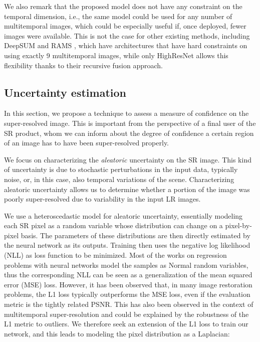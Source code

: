 \documentclass[journal]{IEEEtran}
\begin{document}
We also remark that the proposed model does not have any constraint on the temporal dimension, i.e., the same model could be used for any number of multitemporal images, which could be especially useful if, once deployed, fewer images were available. This is not the case for other existing methods, including DeepSUM \cite{molini2019deepsum} and RAMS \cite{salvetti2020multi}, which have architectures that have hard constraints on using exactly 9 multitemporal images, while only HighResNet \cite{rarefin2020multi} allows this flexibility thanks to their recursive fusion approach.


\subsection{Uncertainty estimation}

In this section, we propose a technique to assess a measure of confidence on the super-resolved image. This is important from the perspective of a final user of the SR product, whom we can inform about the degree of confidence a certain region of an image has to have been super-resolved properly.

We focus on characterizing the \textit{aleatoric} uncertainty \cite{kendall2017uncertainties} on the SR image. This kind of uncertainty is due to stochastic perturbations in the input data, typically noise, or, in this case, also temporal variations of the scene. Characterizing aleatoric uncertainty allows us to determine whether a portion of the image was poorly super-resolved due to variability in the input LR images. 

We use a heteroscedastic model for aleatoric uncertainty, essentially modeling each SR pixel as a random variable whose distribution can change on a pixel-by-pixel basis. The parameters of these distributions are then directly estimated by the neural network as its outputs. Training then uses the negative log likelihood (NLL) as loss function to be minimized. 
Most of the works on regression problems with neural networks \cite{kendall2018multi} model the samples as Normal random variables, thus the corresponding NLL can be seen as a generalization of the mean squared error (MSE) loss. However, it has been observed \cite{gallo2017loss} that, in many image restoration problems, the L1 loss typically outperforms the MSE loss, even if the evaluation metric is the tightly related PSNR. This has also been observed in the context of multitemporal super-resolution \cite{salvetti2020multi} and could be explained by the robustness of the L1 metric to outliers. We therefore seek an extension of the L1 loss to train our network, and this leads to modeling the pixel distribution as a Laplacian:
\end{document}
